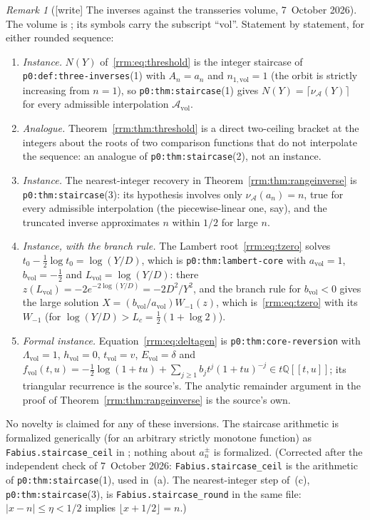 \documentclass[11pt]{article}
\theoremstyle{remark}\newtheorem{remark}[theorem]{Remark}
\newcommand{\file}[1]{\nolinkurl{#1}}
\begin{document}
\begin{remark}[{[write]} The inverses against the transseries volume, 7~October 2026]\label{rrm:rem:transseries}
The volume is
;
its symbols carry the subscript ``vol''. Statement by statement, for either
rounded sequence:
\begin{enumerate}[label=(\alph*)]
\item \emph{Instance.} $N(Y)$ of~\eqref{rrm:eq:threshold} is the integer
 staircase of \file{p0:def:three-inverses}(1) with $A_n=a_n$ and
 $n_{1,\mathrm{vol}}=1$ (the orbit is strictly increasing from $n=1$), so
 \file{p0:thm:staircase}(1) gives $N(Y)=\lceil\nu_{\mathcal A}(Y)\rceil$ for
 every admissible interpolation $\mathcal A_{\mathrm{vol}}$.
\item \emph{Analogue.} Theorem~\ref{rrm:thm:threshold} is a direct
 two-ceiling bracket at the integers about the roots of two comparison
 functions that do not interpolate the sequence: an analogue of
 \file{p0:thm:staircase}(2), not an instance.
\item \emph{Instance.} The nearest-integer recovery in
 Theorem~\ref{rrm:thm:rangeinverse} is \file{p0:thm:staircase}(3): its
 hypothesis involves only $\nu_{\mathcal A}(a_n)=n$, true for every admissible
 interpolation (the piecewise-linear one, say), and the truncated inverse
 approximates $n$ within $1/2$ for large $n$.
\item \emph{Instance, with the branch rule.} The Lambert root~\eqref{rrm:eq:tzero}
 solves $t_0-\tfrac12\log t_0=\log(Y/D)$, which is \file{p0:thm:lambert-core}
 with $a_{\mathrm{vol}}=1$, $b_{\mathrm{vol}}=-\tfrac12$ and
 $L_{\mathrm{vol}}=\log(Y/D)$: there $z(L_{\mathrm{vol}})=-2e^{-2\log(Y/D)}=-2D^2/Y^2$,
 and the branch rule for $b_{\mathrm{vol}}<0$ gives the large solution
 $X=(b_{\mathrm{vol}}/a_{\mathrm{vol}})W_{-1}(z)$, which is~\eqref{rrm:eq:tzero}
 with its $W_{-1}$ (for $\log(Y/D)>L_c=\tfrac12(1+\log2)$).
\item \emph{Formal instance.} Equation~\eqref{rrm:eq:deltagen} is
 \file{p0:thm:core-reversion} with $\Lambda_{\mathrm{vol}}=1$,
 $h_{\mathrm{vol}}=0$, $t_{\mathrm{vol}}=v$, $E_{\mathrm{vol}}=\delta$ and
 $f_{\mathrm{vol}}(t,u)=-\tfrac12\log(1+tu)+\sum_{j\ge1}b_jt^j(1+tu)^{-j}\in
 t\mathbb Q[[t,u]]$; its triangular recurrence is the source's. The analytic
 remainder argument in the proof of Theorem~\ref{rrm:thm:rangeinverse} is the
 source's own.
\end{enumerate}
No novelty is claimed for any of these inversions. The staircase arithmetic
is formalized generically (for an arbitrary strictly monotone function) as
\file{Fabius.staircase_ceil} in
;
nothing about $a_n^\pm$ is formalized. (Corrected after the independent
check of 7~October 2026: \file{Fabius.staircase_ceil} is the arithmetic of
\file{p0:thm:staircase}(1), used in~(a). The nearest-integer step of~(c),
\file{p0:thm:staircase}(3), is \file{Fabius.staircase_round} in the same
file: $|x-n|\le\eta<1/2$ implies $\lfloor x+1/2\rfloor=n$.)
\end{remark}
\end{document}
